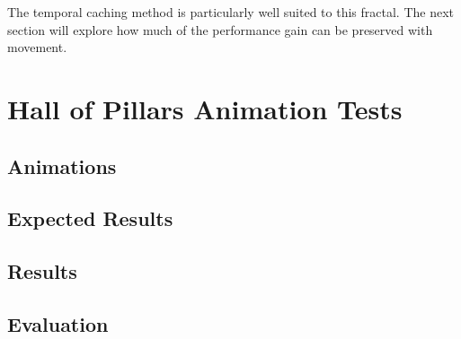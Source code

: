 The temporal caching method is particularly well suited to this fractal. The next section will explore how much of the performance gain can be preserved with movement.

\section{Hall of Pillars Animation Tests}

\subsection{Animations}

\subsection{Expected Results}

\subsection{Results}

\subsection{Evaluation}